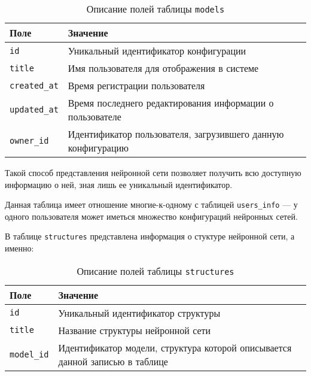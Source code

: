 \begin{table}[!ht]
    \caption{Описание полей таблицы \texttt{models}}
    \label{tbl:models}
    \begin{center}
        \begin{tabular}{|p{}|p{}|}
            \hline
            \textbf{Поле} & \textbf{Значение} \\\hline
            \texttt{id} & Уникальный идентификатор конфигурации \\\hline
            \texttt{title} & Имя пользователя для отображения в системе\\\hline
            \texttt{created\_at} & Время регистрации пользователя\\\hline
            \texttt{updated\_at} & Время последнего редактирования информации о пользователе \\\hline
            \texttt{owner\_id} & Идентификатор пользователя, загрузившего данную конфигурацию \\\hline
        \end{tabular}
    \end{center}
\end{table}

Такой способ представления нейронной сети позволяет получить всю доступную информацию о ней, зная лишь ее уникальный идентификатор.

Данная таблица имеет отношение многие-к-одному с таблицей \texttt{users\_info} --- у одного пользователя может иметься множество конфигураций нейронных сетей.

В таблице \texttt{structures} представлена информация о стуктуре нейронной сети, а именно:

\begin{table}[!ht]
    \caption{Описание полей таблицы \texttt{structures}}
    \label{tbl:structures}
    \begin{center}
        \begin{tabular}{|p{}|p{}|}
            \hline
            \textbf{Поле} & \textbf{Значение} \\\hline
            \texttt{id} & Уникальный идентификатор структуры \\\hline
            \texttt{title} & Название структуры нейронной сети \\\hline
            \texttt{model\_id} & Идентификатор модели, структура которой описывается данной записью в таблице \\\hline
        \end{tabular}
    \end{center}
\end{table}



